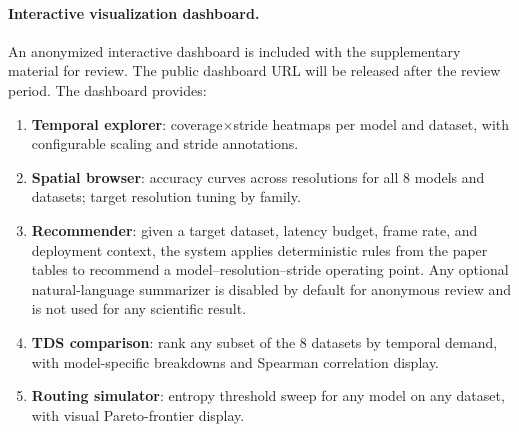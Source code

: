 \documentclass[runningheads]{llncs}
\begin{document}
\paragraph{Interactive visualization dashboard.}
An anonymized interactive dashboard is included with the supplementary material for review. The public dashboard URL will be released after the review period. The dashboard provides:
\begin{enumerate}[leftmargin=*,topsep=2pt,itemsep=1pt]
\item \textbf{Temporal explorer}: coverage$\times$stride heatmaps per model and
  dataset, with configurable scaling and stride annotations.
\item \textbf{Spatial browser}: accuracy curves across resolutions for all
  8 models and datasets; target resolution tuning by family.
\item \textbf{Recommender}: given a target dataset, latency budget, frame rate,
  and deployment context, the system applies deterministic rules from the paper
  tables to recommend a model--resolution--stride operating point. Any optional
  natural-language summarizer is disabled by default for anonymous review and is
  not used for any scientific result.
\item \textbf{TDS comparison}: rank any subset of the 8 datasets by temporal demand,
  with model-specific breakdowns and Spearman correlation display.
\item \textbf{Routing simulator}: entropy threshold sweep for any model on any dataset,
  with visual Pareto-frontier display.
\end{enumerate}
\end{document}
